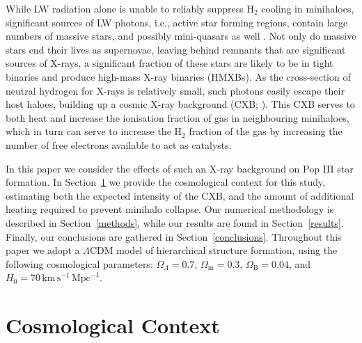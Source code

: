 \documentclass{thesis}
\newcommand{\kms}{\ensuremath{\,\mathrm{km}\,\mathrm{s}^{-1}\xspace}}
\newcommand{\Mpc}{\ensuremath{\,\mathrm{Mpc}}\xspace}
\newcommand{\htwo}{\ensuremath{\mathrm{H}_2}\xspace}
\newcommand{\RefSec}[1]{\mbox{Section~\ref{#1}}}
\begin{document}
While LW radiation alone is unable to reliably suppress \htwo cooling in minihaloes, significant sources of LW photons, i.e., active star forming regions, contain large numbers of massive stars, and possibly mini-quasars as well \citep{KuhlenMadau2005, Jeonetal2012, Jeonetal2014a}.  Not only do massive stars end their lives as supernovae, leaving behind remnants that are significant sources of X-rays, a significant fraction of these stars are likely to be in tight binaries \citep[e.g.,][]{Clarketal2011b,Greifetal2012, Mirocha2014} and produce high-mass X-ray binaries (HMXBs).  As the cross-section of neutral hydrogen for X-rays is relatively small, such photons easily escape their host haloes, building up a cosmic X-ray background (CXB; \citealt{Oh2001, HaimanAbelRees2000, VenkatesanGirouxShull2001, GloverBrand2003, Cen2003, KuhlenMadau2005, Jeonetal2012, Jeonetal2014a}). This CXB serves to both heat and increase the ionisation fraction of gas in neighbouring minihaloes, which in turn can serve to increase the \htwo fraction of the gas by increasing the number of free electrons available to act as catalysts.

In this paper we consider the effects of such an X-ray background on Pop III star formation.  In \RefSec{context} we provide the cosmological context for this study, estimating both the expected intensity of the CXB, and the amount of additional heating required to prevent minihalo collapse. Our numerical methodology is described in \RefSec{methods}, while our results are found in \RefSec{results}.  Finally, our conclusions are gathered in \RefSec{conclusions}.
Throughout this paper we adopt
a $\Lambda$CDM model of hierarchical structure formation, using the following
cosmological parameters: $\Omega_{\Lambda} = 0.7$, $\Omega_{\mathrm m} = 0.3$, $\Omega_{\mathrm B} = 0.04$, and $H_0 = 70 \kms \Mpc^{-1}$.

\section{Cosmological Context}
\label{context}
\end{document}
